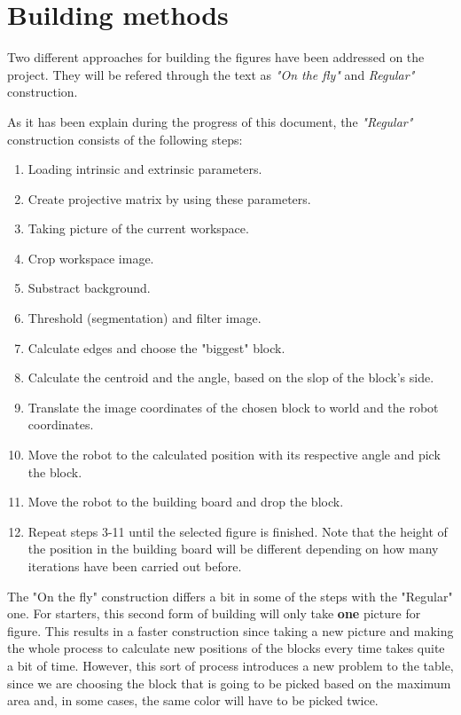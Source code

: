 \chapter{Building methods}\label{ch:building_methods}

Two different approaches for building the figures have been addressed on the project. They will be refered through the text as \textit{"On the fly"} and \textit{Regular"} construction.

As it has been explain during the progress of this document, the \textit{"Regular"} construction consists of the following steps:
\begin{enumerate}
	\item Loading intrinsic and extrinsic parameters.
	\item Create projective matrix by using these parameters.
	\item Taking picture of the current workspace.
	\item Crop workspace image. 
	\item Substract background.
	\item Threshold (segmentation) and filter image.
	\item Calculate edges and choose the "biggest" block.
	\item Calculate the centroid and the angle, based on the slop of the block's side.
	\item Translate the image coordinates of the chosen block to world and the robot coordinates.
	\item Move the robot to the calculated position with its respective angle and pick the block.
	\item Move the robot to the building board and drop the block.
	\item Repeat steps 3-11 until the selected figure is finished. Note that the height of the position in the building board will be different depending on how many iterations have been carried out before.
\end{enumerate}

The "On the fly" construction differs a bit in some of the steps with the "Regular" one.
For starters, this second form of building will only take \textbf{one} picture for figure. This results in a faster construction since taking a new picture and making the whole process to calculate new positions of the blocks every time takes quite a bit of time.
However, this sort of process introduces a new problem to the table, since we are choosing the block that is going to be picked based on the maximum area and, in some cases, the same color will have to be picked twice.

